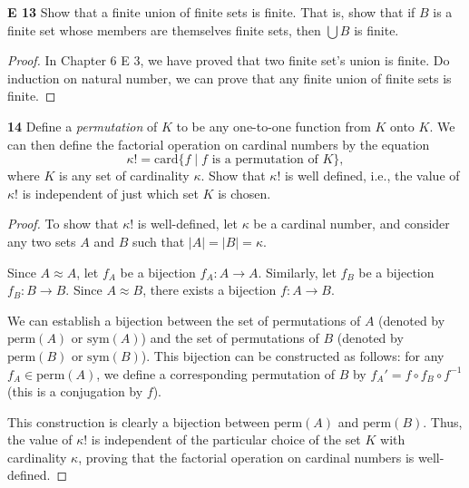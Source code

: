 \begin{question}
    \textbf{E 13}
    Show that a finite union of finite sets is finite. That is, show that if \(B\) is a finite set whose members are themselves finite sets, then \(\bigcup B\) is finite.
\end{question}
\begin{proof}
    In Chapter 6 E 3, we have proved that two finite set's union is finite. Do induction on natural number, we can prove that any finite union of finite sets is finite.
\end{proof}
\begin{question}
    \textbf{14}
    Define a \textit{permutation} of \(K\) to be any one-to-one function from \(K\) onto \(K\). We can then define the factorial operation on cardinal numbers by the equation
    \[
    \kappa! = \text{card} \{ f \mid f \text{ is a permutation of } K \},
    \]
    where \(K\) is any set of cardinality \(\kappa\). Show that \(\kappa!\) is well defined, i.e., the value of \(\kappa!\) is independent of just which set \(K\) is chosen.

\end{question}
\begin{proof}
    To show that \(\kappa!\) is well-defined, let \(\kappa\) be a cardinal number, and consider any two sets \(A\) and \(B\) such that \(|A| = |B| = \kappa\).

    Since \(A \approx A\), let \(f_A\) be a bijection \(f_A: A \rightarrow A\). Similarly, let \(f_B\) be a bijection \(f_B: B \rightarrow B\). Since \(A \approx B\), there exists a bijection \(f: A \rightarrow B\).

    We can establish a bijection between the set of permutations of \(A\) (denoted by \(\mathrm{perm}(A)\) or \(\mathrm{sym}(A)\)) and the set of permutations of \(B\) (denoted by \(\mathrm{perm}(B)\) or \(\mathrm{sym}(B)\)). This bijection can be constructed as follows: for any \(f_A \in \mathrm{perm}(A)\), we define a corresponding permutation of \(B\) by \(f_A' = f \circ f_B \circ f^{-1}\) (this is a conjugation by \(f\)).

    This construction is clearly a bijection between \(\mathrm{perm}(A)\) and \(\mathrm{perm}(B)\). Thus, the value of \(\kappa!\) is independent of the particular choice of the set \(K\) with cardinality \(\kappa\), proving that the factorial operation on cardinal numbers is well-defined.
\end{proof}
